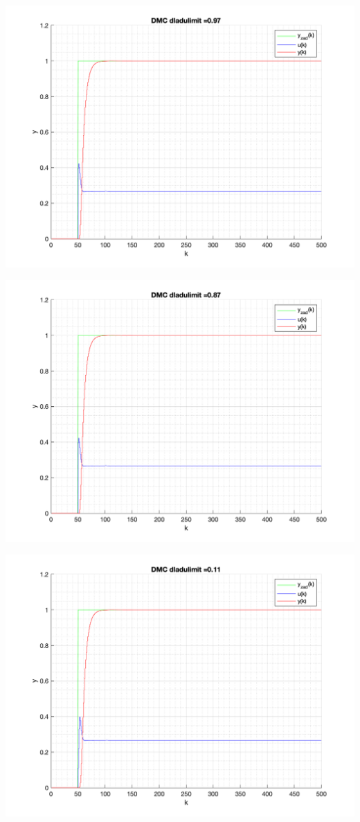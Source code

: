 \documentclass[a4paper, 11pt]{article}
\begin{document}
\begin{enumerate}
 \includegraphics[width=\linewidth]{./ModelsP6_dulimit/P4_DMC_dulimit_0_97_png.png} 
 
 \includegraphics[width=\linewidth]{./ModelsP6_dulimit/P4_DMC_dulimit_0_87_png.png} 
 
 \includegraphics[width=\linewidth]{./ModelsP6_dulimit/P4_DMC_dulimit_0_11_png.png} 
 

\end{enumerate}
\end{document}
